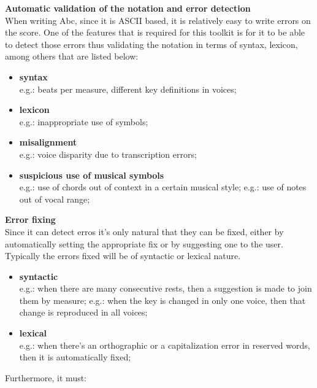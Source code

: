 \documentclass[main.tex]{subfiles}
\begin{document}
\begin{description}
  \item \textbf{Automatic validation of the notation and error detection} \hfill\\
    When writing Abc, since it is ASCII based, it is relatively easy to write errors on the score.
    One of the features that is required for this toolkit is for it to be able to detect those
    errors thus validating the notation in terms of syntax, lexicon, among others that are listed
    below:
    \begin{itemize}
      \item \textbf{syntax}\\
        e.g.: beats per measure, different key definitions in voices;
      \item \textbf{lexicon}\\
        e.g.: inappropriate use of symbols;
      \item \textbf{misalignment}\\
        e.g.: voice disparity due to transcription errors;
      \item \textbf{suspicious use of musical symbols}\\
        e.g.: use of chords out of context in a certain musical style;
        e.g.: use of notes out of vocal range;
    \end{itemize}
  \item \textbf{Error fixing} \hfill\\
    Since it can detect erros it's only natural that they can be fixed, either by automatically
    setting the appropriate fix or by suggesting one to the user. Typically the errors fixed will be
    of syntactic or lexical nature.
    \begin{itemize}
      \item \textbf{syntactic}\\
        e.g.: when there are many consecutive rests, then a suggestion is made to join them by
        measure;
        e.g.: when the key is changed in only one voice, then that change is reproduced in all
        voices;
      \item \textbf{lexical}\\
        e.g.: when there's an orthographic or a capitalization error in reserved words, then it is
        automatically fixed;
    \end{itemize}
\end{description}

Furthermore, it must:
\end{document}
